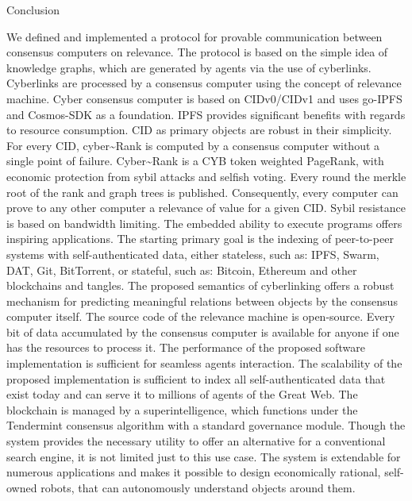 \documentclass[8pt,oneside]{amsart}
\makeatletter
\renewcommand\subsection{\@startsection{subsection}
                                    {2}{\z@}
                                    {-3.25ex\@plus -1ex \@minus -.2ex}
                                    {0ex \@plus .2ex}
                                    {\play\Large}
                        }
\newcommand{\titleSection}[1]{\subsection{#1}}
\makeatother
\begin{document}
\titleSection{Conclusion}\label{conclusion}

We defined and implemented a protocol for provable communication between consensus computers on relevance. The protocol is based on the simple idea of knowledge graphs, which are generated by agents via the use of cyberlinks. Cyberlinks are processed by a consensus computer using the concept of relevance machine. Cyber consensus computer is based on CIDv0/CIDv1 and uses go-IPFS and Cosmos-SDK as a foundation. IPFS provides significant benefits with regards to resource consumption. CID as primary objects are robust in their simplicity. For every CID, cyber\~{}Rank is computed by a consensus computer without a single point of failure. Cyber\~{}Rank is a CYB token weighted PageRank, with economic protection from sybil attacks and selfish voting. Every round the merkle root of the rank and graph trees is published. Consequently, every computer can prove to any other computer a relevance of value for a given CID. Sybil resistance is based on bandwidth limiting. The embedded ability to execute programs offers inspiring applications. The starting primary goal is the indexing of peer-to-peer systems with self-authenticated data, either stateless, such as: IPFS, Swarm, DAT, Git, BitTorrent, or stateful, such as: Bitcoin, Ethereum and other blockchains and tangles. The proposed semantics of cyberlinking offers a robust mechanism for predicting meaningful relations between objects by the consensus computer itself. The source code of the relevance machine is open-source. Every bit of data accumulated by the consensus computer is available for anyone if one has the resources to process it. The performance of the proposed software implementation is sufficient for seamless agents interaction. The scalability of the proposed implementation is sufficient to index all self-authenticated data that exist today and can serve it to millions of agents of the Great Web. The blockchain is managed by a superintelligence, which functions under the Tendermint consensus algorithm with a standard governance module. Though the system provides the necessary utility to offer an alternative for a conventional search engine, it is not limited just to this use case. The system is extendable for numerous applications and makes it possible to design economically rational, self-owned robots, that can autonomously understand objects around them.

\newpage
\end{document}
